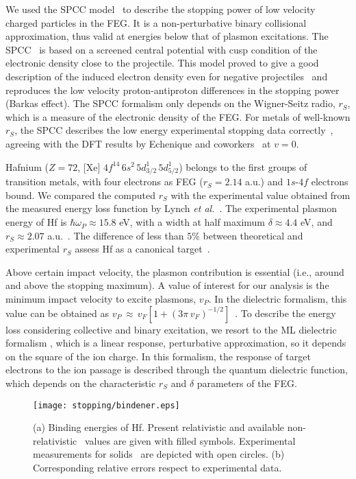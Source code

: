 We used the SPCC model~\cite{mon17} to describe the stopping power of 
low velocity charged particles in the FEG. It is a non-perturbative 
binary collisional approximation, thus valid at energies below that of 
plasmon excitations.  The SPCC~\cite{mon17} is based on a screened 
central potential with cusp condition of the electronic density close 
to the projectile. This model proved to give a good description of the 
induced electron density even for negative projectiles~\cite{mon17} 
and reproduces the low velocity proton-antiproton differences in the 
stopping power (Barkas effect). The SPCC formalism only depends on the 
Wigner-Seitz radio, $r_S$, which is a measure of the electronic density 
of the FEG. For metals of well-known $r_S$, the SPCC describes the low 
energy experimental stopping data correctly~\cite{mon17}, agreeing with 
the DFT results by Echenique and coworkers~\cite{eche81,nagy89} at $v=0$. 

Hafnium ($Z=72$, [Xe] $4f^{14}\,6s^2\,5d_{3/2}^1\,5d_{5/2}^1$) belongs 
to the first groups of transition metals, with four electrons as FEG 
($r_S=2.14$ a.u.) and $1s$-$4f$ electrons bound. We compared the 
computed $r_S$ with the experimental value obtained from the measured 
energy loss function by Lynch \textit{et al.}~\cite{lynch75}. The 
experimental plasmon energy of Hf is $\hbar\omega_P \approx 15.8$ eV, 
with a width at half maximum $\delta\approx 4.4$ eV, and 
$r_S\approx 2.07$ a.u.~\cite{lynch75}. The difference of less than 
$5\%$ between theoretical and experimental $r_S$ assess Hf as a 
canonical target~\cite{mon17}.

Above certain impact velocity, the plasmon contribution is essential
(i.e., around and above the stopping maximum). A value of interest for 
our analysis is the minimum impact velocity to excite plasmons, $v_P$. 
In the dielectric formalism, this value can be obtained as 
$v_P\,\approx\,v_F[1+(3\pi\,v_F)^{-1/2}]$~\cite{suppression}. To 
describe the energy loss considering collective and binary excitation, 
we resort to the ML dielectric formalism \cite{Mermin}, which is a 
linear response, perturbative approximation, so it depends on the 
square of the ion charge. In this formalism, the response of target 
electrons to the ion passage is described through the quantum dielectric 
function, which depends on the characteristic $r_S$ and $\delta$ parameters 
of the FEG. 

\begin{figure*}[!t]
\centering
\texttt{[image: stopping/bindener.eps]}
\caption{(a) Binding energies of Hf. Present relativistic and available 
non-relativistic~\cite{badnell97} values are given with filled symbols. 
Experimental measurements for solids~\cite{williams1995} are depicted 
with open circles. (b) Corresponding relative errors respect to 
experimental data.}
\label{Binding_E}
\end{figure*}

